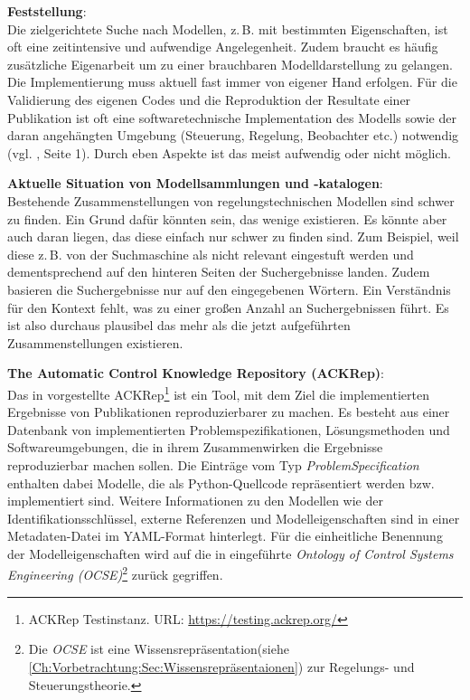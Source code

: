 \textbf{Feststellung}:\\
Die zielgerichtete Suche nach Modellen, z.\,B. mit bestimmten Eigenschaften, ist oft eine zeitintensive und aufwendige Angelegenheit. Zudem braucht es häufig zusätzliche Eigenarbeit um zu einer brauchbaren Modelldarstellung zu gelangen. Die Implementierung muss aktuell fast immer von eigener Hand erfolgen. Für die Validierung des eigenen Codes und die Reproduktion der Resultate einer Publikation ist oft eine softwaretechnische Implementation des Modells sowie der daran angehängten Umgebung (Steuerung, Regelung, Beobachter etc.) notwendig (vgl. \cite{KNHE20b}, Seite 1). Durch eben Aspekte ist das meist aufwendig oder nicht möglich.

\textbf{Aktuelle Situation von Modellsammlungen und -katalogen}: \\
Bestehende Zusammenstellungen von regelungstechnischen Modellen sind schwer zu finden. Ein Grund dafür könnten sein, das wenige existieren. Es könnte aber auch daran liegen, das diese einfach nur schwer zu finden sind. Zum Beispiel, weil diese z.\,B. von der Suchmaschine als nicht relevant eingestuft werden und dementsprechend auf den hinteren Seiten der Suchergebnisse landen. Zudem basieren die Suchergebnisse nur auf den eingegebenen Wörtern. Ein Verständnis für den Kontext fehlt, was zu einer großen Anzahl an Suchergebnissen führt. Es ist also durchaus plausibel das mehr als die jetzt aufgeführten Zusammenstellungen existieren. 

\textbf{The Automatic Control Knowledge Repository (ACKRep)}:\\
Das in \cite{KNHE20a} vorgestellte ACKRep\footnote{ACKRep Testinstanz. \tiny{URL}\normalsize: \url{https://testing.ackrep.org/}} ist ein Tool, mit dem Ziel die implementierten Ergebnisse von Publikationen reproduzierbarer zu machen. Es besteht aus einer Datenbank von implementierten Problemspezifikationen, Lösungsmethoden und Softwareumgebungen, die in ihrem Zusammenwirken die Ergebnisse reproduzierbar machen sollen. Die Einträge vom Typ \textit{ProblemSpecification} enthalten dabei Modelle, die als Python-Quellcode repräsentiert werden bzw. implementiert sind. Weitere Informationen zu den Modellen wie der Identifikationsschlüssel, externe Referenzen und Modelleigenschaften sind in einer Metadaten-Datei im YAML-Format hinterlegt. Für die einheitliche Benennung der Modelleigenschaften wird auf die in \cite{KNHE20b} eingeführte \textit{Ontology of Control Systems Engineering (OCSE)}\footnote{Die \textit{OCSE} ist eine Wissensrepräsentation(siehe \autoref{Ch:Vorbetrachtung:Sec:Wissensrepräsentaionen}) zur Regelungs- und Steuerungstheorie.} zurück gegriffen.

